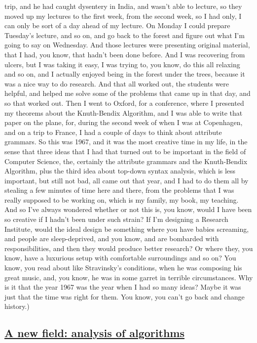 \documentclass[]{article}
\begin{document}
trip, and he had caught dysentery in India, and wasn't able to lecture,
so they moved up my lectures to the first week, from the second week, so
I had only, I can only be sort of a day ahead of my lecture. On Monday I
could prepare Tuesday's lecture, and so on, and go back to the forest
and figure out what I'm going to say on Wednesday. And those lectures
were presenting original material, that I had, you know, that hadn't
been done before. And I was recovering from ulcers, but I was taking it
easy, I was trying to, you know, do this all relaxing and so on, and I
actually enjoyed being in the forest under the trees, because it was a
nice way to do research. And that all worked out, the students were
helpful, and helped me solve some of the problems that came up in that
day, and so that worked out. Then I went to Oxford, for a conference,
where I presented my theorems about the Knuth-Bendix Algorithm, and I
was able to write that paper on the plane, for, during the second week
of when I was at Copenhagen, and on a trip to France, I had a couple of
days to think about attribute grammars. So this was 1967, and it was the
most creative time in my life, in the sense that three ideas that I had
that turned out to be important in the field of Computer Science, the,
certainly the attribute grammars and the Knuth-Bendix Algorithm, plus
the third idea about top-down syntax analysis, which is less important,
but still not bad, all came out that year, and I had to do them all by
stealing a few minutes of time here and there, from the problems that I
was really supposed to be working on, which is my family, my book, my
teaching. And so I've always wondered whether or not this is, you know,
would I have been so creative if I hadn't been under such strain? If I'm
designing a Research Institute, would the ideal design be something
where you have babies screaming, and people are sleep-deprived, and you
know, and are bombarded with responsibilities, and then they would
produce better research? Or where they, you know, have a luxurious setup
with comfortable surroundings and so on? You know, you read about like
Stravinsky's conditions, when he was composing his great music, and, you
know, he was in some garret in terrible circumstances. Why is it that
the year 1967 was the year when I had so many ideas? Maybe it was just
that the time was right for them. You know, you can't go back and change
history.)

\subsection{\texorpdfstring{\href{http://webofstories.com/play/17096}{A
new field: analysis of
algorithms}}{A new field: analysis of algorithms}}\label{a-new-field-analysis-of-algorithms}
\end{document}
